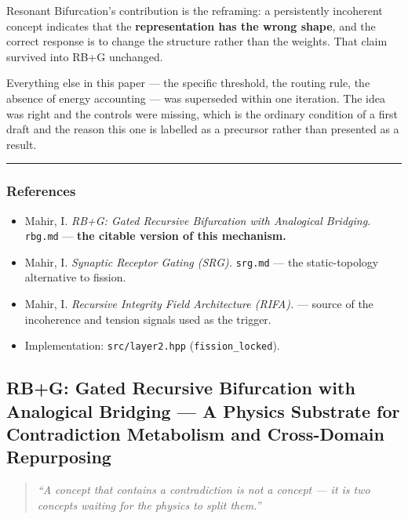 \documentclass[
  11pt,
  a4paper,
]{article}
\providecommand{\tightlist}{%
  \setlength{\itemsep}{0pt}\setlength{\parskip}{0pt}}
\begin{document}
Resonant Bifurcation's contribution is the reframing: a persistently
incoherent concept indicates that the \textbf{representation has the
wrong shape}, and the correct response is to change the structure rather
than the weights. That claim survived into RB+G unchanged.

Everything else in this paper --- the specific threshold, the routing
rule, the absence of energy accounting --- was superseded within one
iteration. The idea was right and the controls were missing, which is
the ordinary condition of a first draft and the reason this one is
labelled as a precursor rather than presented as a result.

\begin{center}\rule{0.5\linewidth}{0.5pt}\end{center}

\subsubsection{References}\label{references}

\begin{itemize}
\tightlist
\item
  Mahir, I. \emph{RB+G: Gated Recursive Bifurcation with Analogical
  Bridging.} \texttt{rbg.md} --- \textbf{the citable version of this
  mechanism.}
\item
  Mahir, I. \emph{Synaptic Receptor Gating (SRG).} \texttt{srg.md} ---
  the static-topology alternative to fission.
\item
  Mahir, I. \emph{Recursive Integrity Field Architecture (RIFA).} ---
  source of the incoherence and tension signals used as the trigger.
\item
  Implementation: \texttt{src/layer2.hpp} (\texttt{fission\_locked}).
\end{itemize}

\newpage

\subsection{RB+G: Gated Recursive Bifurcation with Analogical Bridging
--- A Physics Substrate for Contradiction Metabolism and Cross-Domain
Repurposing}\label{rbg-gated-recursive-bifurcation-with-analogical-bridging-a-physics-substrate-for-contradiction-metabolism-and-cross-domain-repurposing}

\begin{quote}
\emph{``A concept that contains a contradiction is not a concept --- it
is two concepts waiting for the physics to split them.''}
\end{quote}
\end{document}
